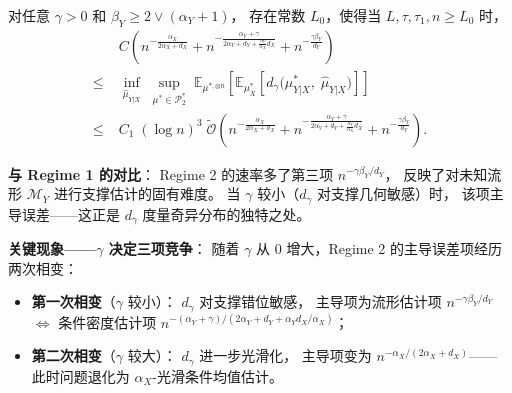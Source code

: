 \begin{Theorem}\label{def:thm-regime2}
    对任意 $\gamma > 0$ 和 $\beta_Y \geq 2 \vee (\alpha_Y + 1)$，
    存在常数 $L_0$，使得当 $L, \tau, \tau_1, n \geq L_0$ 时，
    \begin{equation}\label{eq:regime2-minimax}
        \begin{aligned}
            & C\!\left(
                n^{-\frac{\alpha_X}{2\alpha_X + d_X}}
                + n^{-\frac{\alpha_Y + \gamma}{2\alpha_Y + d_Y + \frac{\alpha_Y}{\alpha_X}d_X}}
                + n^{-\frac{\gamma\beta_Y}{d_Y}}
            \right) \\
            \leq\;&
            \inf_{\widehat{\mu}_{Y|X}}\;
            \sup_{\mu^* \in \mathcal{P}_2^*}
            \;
            \mathbb{E}_{\mu^{*,\otimes n}}\!\left[
                \mathbb{E}_{\mu^*_X}\!\left[
                    d_\gamma\!\big(\mu^*_{Y|X},\; \widehat{\mu}_{Y|X}\big)
                \right]
            \right] \\
            \leq\;&
            C_1\;(\log n)^3\;
            \widetilde{\mathcal{O}}\!\left(
                n^{-\frac{\alpha_X}{2\alpha_X + d_X}}
                + n^{-\frac{\alpha_Y + \gamma}{2\alpha_Y + d_Y + \frac{\alpha_Y}{\alpha_X}d_X}}
                + n^{-\frac{\gamma\beta_Y}{d_Y}}
            \right).
        \end{aligned}
    \end{equation}
\end{Theorem}

\textbf{与 Regime 1 的对比}：
Regime 2 的速率多了第三项 $n^{-\gamma\beta_Y/d_Y}$，
反映了对未知流形 $\mathcal{M}_Y$ 进行支撑估计的固有难度。
当 $\gamma$ 较小（$d_\gamma$ 对支撑几何敏感）时，
该项主导误差——这正是 $d_\gamma$ 度量奇异分布的独特之处。

\textbf{关键现象——$\gamma$ 决定三项竞争}：
随着 $\gamma$ 从 0 增大，Regime 2 的主导误差项经历两次相变：

\begin{itemize}
    \item \textbf{第一次相变}（$\gamma$ 较小）：
          $d_\gamma$ 对支撑错位敏感，
          主导项为流形估计项 $n^{-\gamma\beta_Y/d_Y}$
          $\Longleftrightarrow$ 条件密度估计项
          $n^{-(\alpha_Y+\gamma)/(2\alpha_Y+d_Y+\alpha_Y d_X/\alpha_X)}$；
    \item \textbf{第二次相变}（$\gamma$ 较大）：
          $d_\gamma$ 进一步光滑化，
          主导项变为 $n^{-\alpha_X/(2\alpha_X+d_X)}$——
          此时问题退化为 $\alpha_X$-光滑条件均值估计。
\end{itemize}

